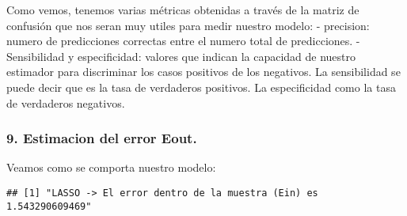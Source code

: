 \documentclass[]{article}
\newenvironment{Shaded}{\begin{snugshade}}{\end{snugshade}}
\newcommand{\KeywordTok}[1]{\textcolor[rgb]{0.13,0.29,0.53}{\textbf{#1}}}
\newcommand{\DataTypeTok}[1]{\textcolor[rgb]{0.13,0.29,0.53}{#1}}
\newcommand{\DecValTok}[1]{\textcolor[rgb]{0.00,0.00,0.81}{#1}}
\newcommand{\StringTok}[1]{\textcolor[rgb]{0.31,0.60,0.02}{#1}}
\newcommand{\CommentTok}[1]{\textcolor[rgb]{0.56,0.35,0.01}{\textit{#1}}}
\newcommand{\OperatorTok}[1]{\textcolor[rgb]{0.81,0.36,0.00}{\textbf{#1}}}
\newcommand{\NormalTok}[1]{#1}
\begin{document}
Como vemos, tenemos varias métricas obtenidas a través de la matriz de
confusión que nos seran muy utiles para medir nuestro modelo: -
precision: numero de predicciones correctas entre el numero total de
predicciones. - Sensibilidad y especificidad: valores que indican la
capacidad de nuestro estimador para discriminar los casos positivos de
los negativos. La sensibilidad se puede decir que es la tasa de
verdaderos positivos. La especificidad como la tasa de verdaderos
negativos.

\subsubsection{9. Estimacion del error
Eout.}\label{estimacion-del-error-eout.}

Veamos como se comporta nuestro modelo:

\begin{Shaded}
\end{Shaded}

\begin{verbatim}
## [1] "LASSO -> El error dentro de la muestra (Ein) es 1.543290609469"
\end{verbatim}

\begin{Shaded}
\end{Shaded}
\end{document}
